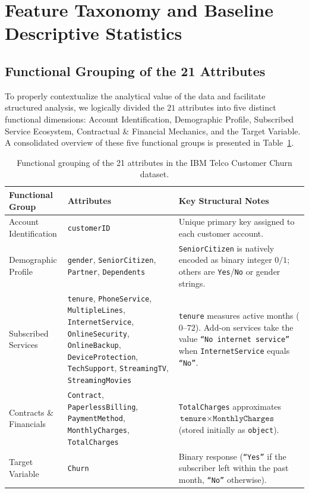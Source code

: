 \section{Feature Taxonomy and Baseline Descriptive Statistics}

\subsection{Functional Grouping of the 21 Attributes}
To properly contextualize the analytical value of the data and facilitate structured analysis, we logically divided the $21$ attributes into five distinct functional dimensions: Account Identification, Demographic Profile, Subscribed Service Ecosystem, Contractual \& Financial Mechanics, and the Target Variable. A consolidated overview of these five functional groups is presented in Table~\ref{tab:feature_groups}.

\begin{table}[htbp]
\centering
\small
\begin{tabularx}{\textwidth}{p{} X X}
\toprule
\textbf{Functional Group} & \textbf{Attributes} & \textbf{Key Structural Notes} \\
\midrule
Account Identification & \texttt{customerID} & Unique primary key assigned to each customer account. \\
\addlinespace
Demographic Profile & \texttt{gender}, \texttt{SeniorCitizen}, \texttt{Partner}, \texttt{Dependents} & \texttt{SeniorCitizen} is natively encoded as binary integer $0/1$; others are \texttt{Yes}/\texttt{No} or gender strings. \\
\addlinespace
Subscribed Services & \texttt{tenure}, \texttt{PhoneService}, \texttt{MultipleLines}, \texttt{InternetService}, \texttt{OnlineSecurity}, \texttt{OnlineBackup}, \texttt{DeviceProtection}, \texttt{TechSupport}, \texttt{StreamingTV}, \texttt{StreamingMovies} & \texttt{tenure} measures active months ($0\text{--}72$). Add-on services take the value \texttt{``No internet service''} when \texttt{InternetService} equals \texttt{``No''}. \\
\addlinespace
Contracts \& Financials & \texttt{Contract}, \texttt{PaperlessBilling}, \texttt{PaymentMethod}, \texttt{MonthlyCharges}, \texttt{TotalCharges} & \texttt{TotalCharges} approximates $\texttt{tenure} \times \texttt{MonthlyCharges}$ (stored initially as \texttt{object}). \\
\addlinespace
Target Variable & \texttt{Churn} & Binary response (\texttt{``Yes''} if the subscriber left within the past month, \texttt{``No''} otherwise). \\
\bottomrule
\end{tabularx}
\caption{Functional grouping of the 21 attributes in the IBM Telco Customer Churn dataset.}
\label{tab:feature_groups}
\end{table}

